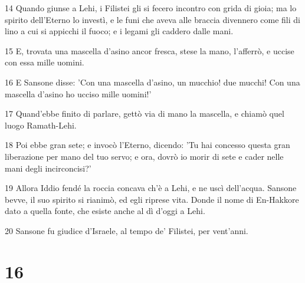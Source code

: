 \par 14 Quando giunse a Lehi, i Filistei gli si fecero incontro con grida di gioia; ma lo spirito dell'Eterno lo investì, e le funi che aveva alle braccia divennero come fili di lino a cui si appicchi il fuoco; e i legami gli caddero dalle mani.
\par 15 E, trovata una mascella d'asino ancor fresca, stese la mano, l'afferrò, e uccise con essa mille uomini.
\par 16 E Sansone disse: 'Con una mascella d'asino, un mucchio! due mucchi! Con una mascella d'asino ho ucciso mille uomini!'
\par 17 Quand'ebbe finito di parlare, gettò via di mano la mascella, e chiamò quel luogo Ramath-Lehi.
\par 18 Poi ebbe gran sete; e invocò l'Eterno, dicendo: 'Tu hai concesso questa gran liberazione per mano del tuo servo; e ora, dovrò io morir di sete e cader nelle mani degli incirconcisi?'
\par 19 Allora Iddio fendé la roccia concava ch'è a Lehi, e ne uscì dell'acqua. Sansone bevve, il suo spirito si rianimò, ed egli riprese vita. Donde il nome di En-Hakkore dato a quella fonte, che esiste anche al dì d'oggi a Lehi.
\par 20 Sansone fu giudice d'Israele, al tempo de' Filistei, per vent'anni.

\chapter{16}

